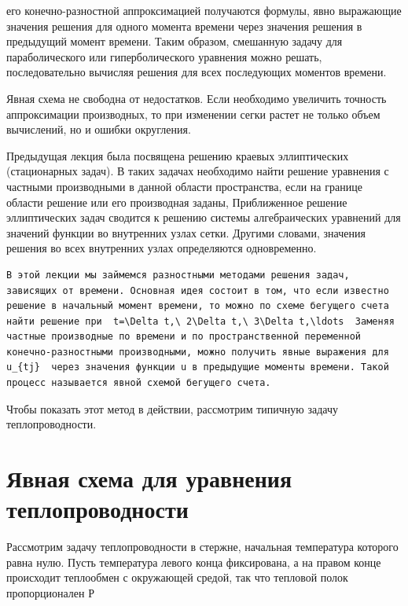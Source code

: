 \documentclass[
  ukrainian,
]{article}
\begin{document}
его конечно-разностной аппроксимацией получаются формулы, явно
выражающие значения решения для одного момента времени через значения
решения в предыдущий момент времени. Таким образом, смешанную задачу для
параболического или гиперболического уравнения можно решать,
последовательно вычисляя решения для всех последующих моментов времени.

Явная схема не свободна от недостатков. Если необходимо увеличить
точность аппроксимации производных, то при изменении сегки растет не
только объем вычислений, но и ошибки округления.

Предыдущая лекция была посвящена решению краевых эллиптических
(стационарных задач). В таких задачах необходимо найти решение уравнения
с частными производными в данной области пространства, если на границе
области решение или его производная заданы, Приближенное решение
эллиптических задач сводится к решению системы алгебраических уравнений
для значений функции во внутренних узлах сетки. Другими словами,
значения решения во всех внутренних узлах определяются одновременно.

\begin{verbatim}
В этой лекции мы займемся разностными методами решения задач, зависящих от времени. Основная идея состоит в том, что если известно решение в начальный момент времени, то можно по схеме бегущего счета найти решение при  t=\Delta t,\ 2\Delta t,\ 3\Delta t,\ldots  Заменяя частные производные по времени и по пространственной переменной конечно-разностными производными, можно получить явные выражения для  u_{tj}  через значения функции u в предыдущие моменты времени. Такой процесс называется явной схемой бегущего счета.
\end{verbatim}

Чтобы показать этот метод в действии, рассмотрим типичную задачу
теплопроводности.

\section{Явная схема для уравнения
теплопроводности}\label{ux44fux432ux43dux430ux44f-ux441ux445ux435ux43cux430-ux434ux43bux44f-ux443ux440ux430ux432ux43dux435ux43dux438ux44f-ux442ux435ux43fux43bux43eux43fux440ux43eux432ux43eux434ux43dux43eux441ux442ux438}

Рассмотрим задачу теплопроводности в стержне, начальная температура
которого равна нулю. Пусть температура левого конца фиксирована, а на
правом конце происходит теплообмен с окружающей средой, так что тепловой
полок пропорционален Р
\end{document}
